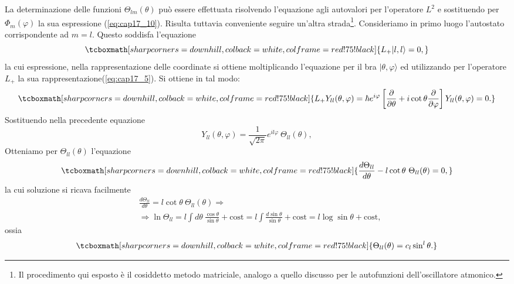 \documentclass[a4paper,12pt,oneside]{book}
\begin{document}
La determinazione delle funzioni $\Theta _{lm} (\theta)$ può essere effettuata risolvendo l'equazione agli autovalori per l'operatore $L^2$ e sostituendo per $\Phi _m (\varphi)$ la sua espressione (\ref{eq:cap17_10}). Risulta tuttavia conveniente seguire un'altra strada\footnote{Il procedimento qui esposto è il cosiddetto metodo matriciale, analogo a quello discusso per le autofunzioni dell'oscillatore atmonico.}. Consideriamo in primo luogo l'autostato corrispondente ad $m=l$. Questo soddisfa l'equazione
	\begin{equation}
		\tcboxmath[sharp corners=downhill, colback=white, colframe=red!75!black]{
			L_+ \vert l,l\rangle =0,
			}
	\end{equation}
la cui espressione, nella rappresentazione delle coordinate si ottiene moltiplicando l'equazione per il bra $\vert \theta, \varphi \rangle$ ed utilizzando per  l'operatore $L_+$ la sua rappresentazione(\ref{eq:cap17_5}). Si ottiene in tal modo:
	\begin{equation}
		\tcboxmath[sharp corners=downhill, colback=white, colframe=red!75!black]{
			L_+Y_{ll}(\theta , \varphi ) = \hbar e^{i\varphi}\left[\frac{\partial}{\partial\theta}+i \cot\theta \frac{\partial}{\partial \varphi}\right]Y_{ll}(\theta , \varphi ) =0 .
			}
	\end{equation}
Sostituendo nella precedente equazione 
	\begin{equation}
		Y_{ll}(\theta , \varphi ) = \frac{1}{\sqrt{2\pi}}e^{il\varphi}\ \Theta _{ll} (\theta ) ,
	\end{equation}
Otteniamo per $\Theta _{ll} (\theta )$ l'equazione
	\begin{equation}
		\tcboxmath[sharp corners=downhill, colback=white, colframe=red!75!black]{
			\frac{d\Theta _{ll}}{d \theta}-l\cot\theta \ \Theta _{ll} (\theta )=0 ,
			}
	\end{equation}
la cui soluzione si ricava facilmente
	\begin{align}
	& \frac{d\Theta _{ll}}{d \theta}=l\cot\theta \ \Theta _{ll} (\theta ) \Rightarrow \nonumber \\
	& \Rightarrow \ln \Theta _{ll} = l \int d\theta \ \frac{\cos \theta}{\sin \theta}+ \textrm{cost} = l \int  \frac{d\sin \theta}{\sin \theta}+ \textrm{cost} = l \log \sin \theta + \textrm{cost} ,
	\end{align}
ossia
	\begin{equation}
		\tcboxmath[sharp corners=downhill, colback=white, colframe=red!75!black]{
			\Theta _{ll} (\theta )= c_l \sin ^l \theta .
			}
	\end{equation}
\end{document}
